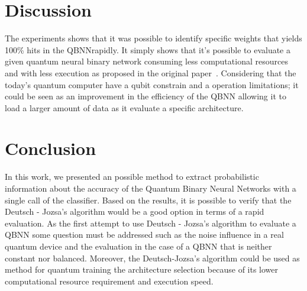 \documentclass[conference]{IEEEtran}
\begin{document}
\section{Discussion}\label{sec:discussion}
 The experiments shows that it was possible to identify specific weights that yields 100\% hits in the QBNN\@ rapidly.
It simply shows that it's possible to evaluate a given quantum neural binary network consuming less computational resources and
with less execution as proposed in the original paper~\cite{fawaz2019training}.
Considering that the today's quantum computer have a qubit constrain and a operation limitations;
it could be seen as an improvement in the efficiency of the QBNN allowing it to load a larger amount of data as it evaluate
a specific architecture.



\section{Conclusion}\label{sec:conclusion}

  In this work, we presented an possible method to extract probabilistic information about the accuracy of the
  Quantum Binary Neural Networks with a single call of the classifier.
  Based on the results, it is possible to verify that the Deutsch - Jozsa's algorithm would be a good option in terms
  of a rapid evaluation.
  As the first attempt to use Deutsch - Jozsa's algorithm to evaluate a QBNN some question must be addressed such as the
  noise influence in a real quantum device and the evaluation in the case of a QBNN that is neither constant nor balanced.
  Moreover, the Deutsch-Jozsa's algorithm could be used as method for quantum training the architecture selection because
  of its lower computational resource requirement and execution speed.



\end{document}
